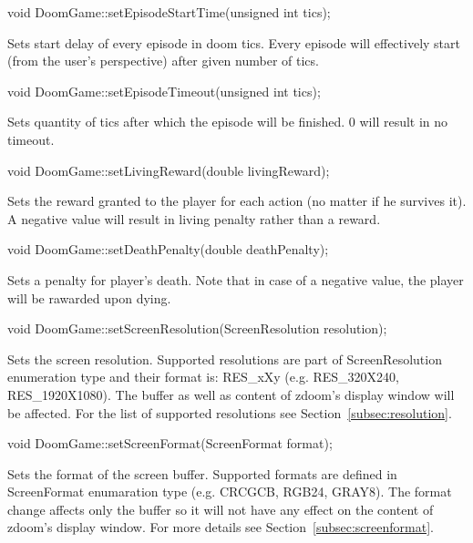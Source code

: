 \vspace{20pt}
\begin{clinee}    
void DoomGame::setEpisodeStartTime(unsigned int tics);
\end{clinee}

Sets start delay of every episode in doom tics. Every episode will effectively start (from the user's perspective) after given number of tics.


\vspace{20pt}
\begin{clinee}
void DoomGame::setEpisodeTimeout(unsigned int tics);
\end{clinee}

Sets quantity of tics after which the episode will be finished. 0 will result in no timeout.


\vspace{20pt}
\begin{clinee}
void DoomGame::setLivingReward(double livingReward);
\end{clinee}

Sets the reward granted to the player for each action (no matter if he survives it). A negative value will result in living penalty rather than a reward.


\vspace{20pt}
\begin{clinee}
void DoomGame::setDeathPenalty(double deathPenalty);
\end{clinee}

	Sets a penalty for player's death. Note that in case of a negative value, the player will be rawarded upon dying.


\vspace{20pt}
\begin{clinee}
void DoomGame::setScreenResolution(ScreenResolution resolution);
\end{clinee}

	Sets the screen resolution. Supported resolutions are part of ScreenResolution enumeration type and their format is: RES\_xXy (e.g. RES\_320X240, RES\_1920X1080). The buffer as well as content of zdoom's display window will be affected. For the list of supported resolutions see Section~\ref{subsec:resolution}.


\vspace{20pt}
\begin{clinee}
void DoomGame::setScreenFormat(ScreenFormat format);
\end{clinee}
	
	Sets the format of the screen buffer. Supported formats are defined in ScreenFormat enumaration type (e.g. CRCGCB, RGB24, GRAY8). The format change affects only the buffer so it will not have any effect on the content of zdoom's display window. For more details see Section~\ref{subsec:screenformat}.


